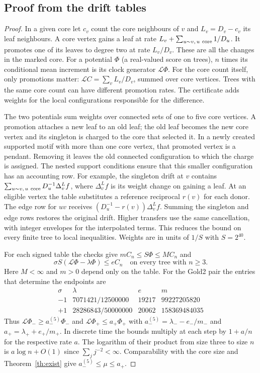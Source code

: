 \documentclass[11pt]{article}
\theoremstyle{remark}
\numberwithin{equation}{section}
\begin{document}
\subsection{Proof from the drift tables}\label{sec:enc-proof}
\begin{proof}
In a given core let $c_v$ count the core neighbours of $v$ and $L_v=D_v-c_v$ its leaf neighbours. A core vertex gains a leaf at rate $L_v+\sum_{u\sim v,\,u\ {\rm core}}1/D_u$. It promotes one of its leaves to degree two at rate $L_v/D_v$. These are all the changes in the marked core. For a potential $\Phi$ (a real-valued score on trees), $n$ times its conditional mean increment is its clock generator $\mathcal L\Phi$. For the core count itself, only promotions matter: $\mathcal L C=\sum_v L_v/D_v$, summed over core vertices. Trees with the same core count can have different promotion rates. The certificate adds weights for the local configurations responsible for the difference.

The two potentials sum weights over connected sets of one to five core vertices. A promotion attaches a new leaf to an old leaf; the old leaf becomes the new core vertex and its singleton is charged to the core that selected it. In a newly created supported motif with more than one core vertex, that promoted vertex is a pendant. Removing it leaves the old connected configuration to which the charge is assigned. The nested support conditions ensure that this smaller configuration has an accounting row. For example, the singleton drift at $v$ contains $\sum_{u\sim v,\,u\ {\rm core}}D_u^{-1}\Delta_v^L f$, where $\Delta_v^L f$ is its weight change on gaining a leaf. At an eligible vertex the table substitutes a reference reciprocal $r(v)$ for each donor. The edge row for $uv$ receives $(D_u^{-1}-r(v))\Delta_v^L f$. Summing the singleton and edge rows restores the original drift. Higher transfers use the same cancellation, with integer envelopes for the interpolated terms. This reduces the bound on every finite tree to local inequalities. Weights are in units of $1/S$ with $S=2^{40}$.

For each signed table the checks give $m C_n\le S\Phi\le M C_n$ and
\[
 \sigma S(\mathcal L\Phi-\lambda\Phi)\le e C_n
 \quad\text{on every tree with }n\ge3.
\]
Here $M<\infty$ and $m>0$ depend only on the table. For the Gold2 pair the entries that determine the endpoints are
\[
\begin{array}{c|r|r|r}
 \sigma &\lambda&e&m\\ \hline
 -1&7071421/12500000&19217&99227205820\\
 +1&28286843/50000000&20062&158369484035
\end{array}
\]
Thus $\mathcal L\Phi_-\ge a_-^{(5)}\Phi_-$ and $\mathcal L\Phi_+\le a_+\Phi_+$ with $a_-^{(5)}=\lambda_--e_-/m_-$ and $a_+=\lambda_++e_+/m_+$. In discrete time the bounds multiply at each step by $1+a/n$ for the respective rate $a$. The logarithm of their product from size three to size $n$ is $a\log n+O(1)$ since $\sum_j j^{-2}<\infty$. Comparability with the core size and Theorem~\ref{th:exist} give $a_-^{(5)}\le\mu\le a_+$.


\end{proof}
\end{document}
